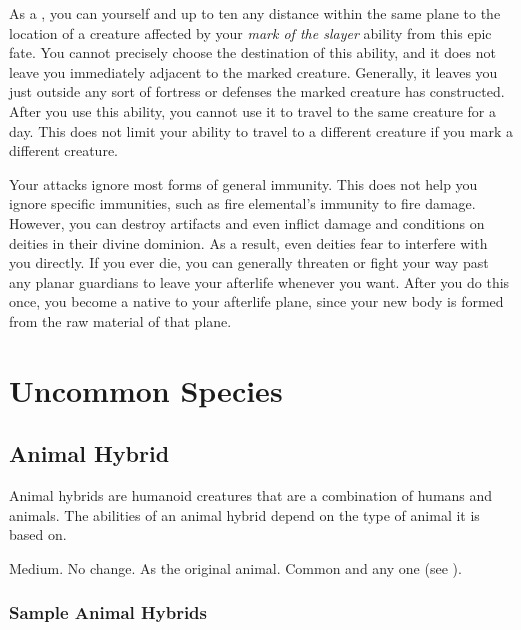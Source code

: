              As a , you can  yourself and up to ten  any distance within the same plane to the location of a creature affected by your \textit{mark of the slayer} ability from this epic fate.
            You cannot precisely choose the destination of this ability, and it does not leave you immediately adjacent to the marked creature.
            Generally, it leaves you just outside any sort of fortress or defenses the marked creature has constructed.
            After you use this ability, you cannot use it to travel to the same creature for a day.
            This does not limit your ability to travel to a different creature if you mark a different creature.

            Your attacks ignore most forms of general immunity.
            This does not help you ignore specific immunities, such as fire elemental's immunity to fire damage.
            However, you can destroy artifacts and even inflict damage and conditions on deities in their divine dominion.
            As a result, even deities fear to interfere with you directly.
            If you ever die, you can generally threaten or fight your way past any planar guardians to leave your afterlife whenever you want.
            After you do this once, you become a  native to your afterlife plane, since your new body is formed from the raw material of that plane.

\section{Uncommon Species}\label{Uncommon Species}

    \subsection{Animal Hybrid}
        Animal hybrids are humanoid creatures that are a combination of humans and animals.
        The abilities of an animal hybrid depend on the type of animal it is based on.

         Medium.
         No change.
         As the original animal.
         Common and any one  (see ).

        \subsubsection{Sample Animal Hybrids}

